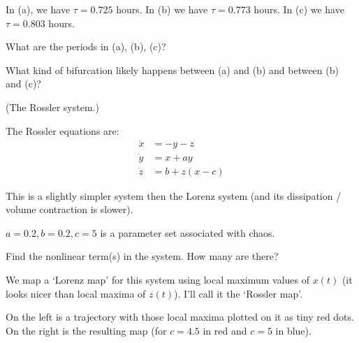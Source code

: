 \documentclass[12pt,letterpaper,noanswers]{exam}
\begin{document}
\begin{questions}
In (a), we have $\tau = 0.725$ hours.  In (b) we have $\tau = 0.773$ hours.  In (c) we have $\tau = 0.803$ hours.

\begin{parts}
\item What are the periods in (a), (b), (c)?
\item What kind of bifurcation likely happens between (a) and (b) and between (b) and (c)?
\end{parts}

\question (The Rossler system.)

The Rossler equations are:
\begin{align*}
\dot x &= -y-z \\
\dot y &= x + a y \\
\dot z &= b + z(x-c)
\end{align*}

This is a slightly simpler system then the Lorenz system (and its dissipation / volume contraction is slower).


$a = 0.2, b=0.2,c=5$ is a parameter set associated with chaos.

\begin{parts}
\item Find the nonlinear term(s) in the system.  How many are there?
\item We map a `Lorenz map' for this system using local maximum values of $x(t)$ (it looks nicer than local maxima of $z(t)$).  I'll call it the `Rossler map'.  

On the left is a trajectory with those local maxima plotted on it as tiny red dots. On the right is the resulting map (for $c = 4.5$ in red and $c=5$ in blue).


\end{parts}
\end{questions}
\end{document}
